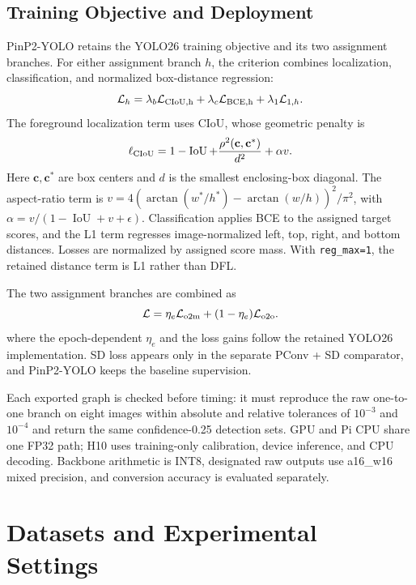 \documentclass[lettersize,journal]{IEEEtran}
\begin{document}
\subsection{Training Objective and Deployment}
PinP2-YOLO retains the YOLO26 training objective and its two assignment branches. For either assignment branch $h$, the criterion combines localization, classification, and normalized box-distance regression:
\begin{equation}
\mathcal L_h=\lambda_b\mathcal L_{\rm CIoU,h}+\lambda_c\mathcal L_{\rm BCE,h}+\lambda_1\mathcal L_{1,h}.
\label{eq:lossbranch}
\end{equation}
The foreground localization term uses CIoU\cite{zheng2020diou}, whose geometric penalty is
\begin{equation}
\ell_{\rm CIoU}=1-\operatorname{IoU}+\frac{\rho^2(\mathbf c,\mathbf c^*)}{d^2}+\alpha v.
\label{eq:ciou}
\end{equation}
Here $\mathbf c,\mathbf c^*$ are box centers and $d$ is the smallest enclosing-box diagonal. The aspect-ratio term is $v=4(\arctan(w^*/h^*)-\arctan(w/h))^2/\pi^2$, with $\alpha=v/(1-\operatorname{IoU}+v+\epsilon)$. Classification applies BCE to the assigned target scores, and the L1 term regresses image-normalized left, top, right, and bottom distances. Losses are normalized by assigned score mass. With \texttt{reg\_max=1}, the retained distance term is L1 rather than DFL.

The two assignment branches are combined as
\begin{equation}
\mathcal L=\eta_e\mathcal L_{\rm o2m}+(1-\eta_e)\mathcal L_{\rm o2o}.
\label{eq:loss}
\end{equation}
where the epoch-dependent $\eta_e$ and the loss gains follow the retained YOLO26 implementation. SD loss appears only in the separate PConv + SD comparator, and PinP2-YOLO keeps the baseline supervision.

Each exported graph is checked before timing: it must reproduce the raw one-to-one branch on eight images within absolute and relative tolerances of $10^{-3}$ and $10^{-4}$ and return the same confidence-0.25 detection sets. GPU and Pi CPU share one FP32 path; H10 uses training-only calibration, device inference, and CPU decoding. Backbone arithmetic is INT8, designated raw outputs use a16\_w16 mixed precision, and conversion accuracy is evaluated separately\cite{jacob2018quantization}.

\section{Datasets and Experimental Settings}
\end{document}

